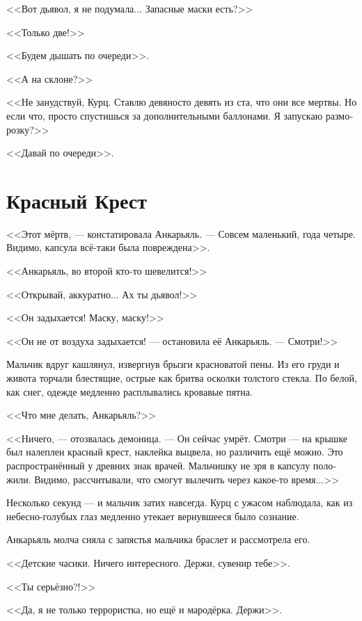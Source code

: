 \documentclass[a4paper,10pt,fleqn]{book}\usepackage{polyglossia}\setdefaultlanguage[babelshorthands=true]{russian}\setotherlanguage{english}\defaultfontfeatures{Ligatures=TeX,Mapping=tex-text}\usepackage{xcolor}\newcommand{\ml}[3]{#2}
\begin{document}
<<Вот дьявол, я не подумала...
Запасные маски есть?>>

<<Только две!>>

<<Будем дышать по очереди>>.

<<А на склоне?>>

<<Не занудствуй, Курц.
Ставлю девяносто девять из ста, что они все мертвы.
Но если что, просто спустишься за дополнительными баллонами.
Я запускаю разморозку?>>

<<Давай по очереди>>.

\section{Красный Крест}

<<Этот мёртв, --- констатировала Анкарьяль.
--- Совсем маленький, года четыре.
Видимо, капсула всё-таки была повреждена>>.

<<Анкарьяль, во второй кто-то шевелится!>>

<<Открывай, аккуратно... Ах ты дьявол!>>

<<Он задыхается!
Маску, маску!>>

<<Он не от воздуха задыхается! --- остановила её Анкарьяль.
--- Смотри!>>

Мальчик вдруг кашлянул, извергнув брызги красноватой пены.
Из его груди и живота торчали блестящие, острые как бритва осколки толстого стекла.
По белой, как снег, одежде медленно расплывались кровавые пятна.

<<Что мне делать, Анкарьяль?>>

<<Ничего, --- отозвалась демоница.
--- Он сейчас умрёт.
Смотри --- на крышке был налеплен красный крест, наклейка выцвела, но различить ещё можно.
Это распространённый у древних знак врачей.
Мальчишку не зря в капсулу положили.
Видимо, рассчитывали, что смогут вылечить через какое-то время...>>

Несколько секунд --- и мальчик затих навсегда.
Курц с ужасом наблюдала, как из небесно-голубых глаз медленно утекает вернувшееся было сознание.

Анкарьяль молча сняла с запястья мальчика браслет и рассмотрела его.

\ml{$0$}
{<<Детские часики.}
{``A children watch.}
\ml{$0$}
{Ничего интересного.}
{Zero percent interest.}
Держи, сувенир тебе>>.

\ml{$0$}
{<<Ты серьёзно?!>>}
{``Seriously!''}

\ml{$0$}
{<<Да, я не только террористка, но ещё и мародёрка.}
{``Yes, I'm not only a terrorist, but a marauder too.}
Держи>>.
\end{document}
